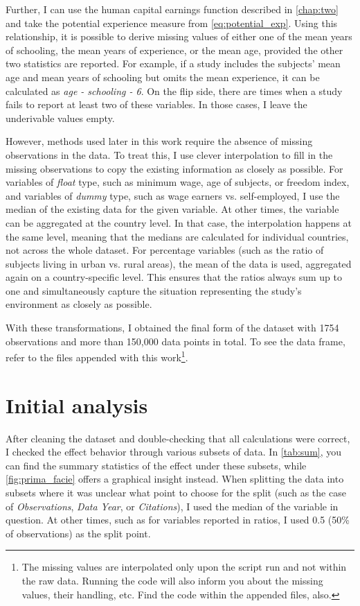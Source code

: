 Further, I can use the human capital earnings function described in \autoref{chap:two} and take the potential experience measure from \autoref{eq:potential_exp}. Using this relationship, it is possible to derive missing values of either one of the mean years of schooling, the mean years of experience, or the mean age, provided the other two statistics are reported. For example, if a study includes the subjects' mean age and mean years of schooling but omits the mean experience, it can be calculated as \textit{age - schooling - 6}. On the flip side, there are times when a study fails to report at least two of these variables. In those cases, I leave the underivable values empty.

However, methods used later in this work require the absence of missing observations in the data. To treat this, I use clever interpolation to fill in the missing observations to copy the existing information as closely as possible. For variables of \textit{float} type, such as minimum wage, age of subjects, or freedom index, and variables of \textit{dummy} type, such as wage earners vs. self-employed, I use the median of the existing data for the given variable. At other times, the variable can be aggregated at the country level. In that case, the interpolation happens at the same level, meaning that the medians are calculated for individual countries, not across the whole dataset. For percentage variables (such as the ratio of subjects living in urban vs. rural areas), the mean of the data is used, aggregated again on a country-specific level. This ensures that the ratios always sum up to one and simultaneously capture the situation representing the study's environment as closely as possible.

With these transformations, I obtained the final form of the dataset with 1754 observations and more than 150,000 data points in total. To see the data frame, refer to the files appended with this work\footnote{The missing values are interpolated only upon the script run and not within the raw data. Running the code will also inform you about the missing values, their handling, etc. Find the code within the appended files, also.}.

\section{Initial analysis}
\label{sec:initial_analysis}

After cleaning the dataset and double-checking that all calculations were correct, I checked the effect behavior through various subsets of data. In \autoref{tab:sum}, you can find the summary statistics of the effect under these subsets, while \autoref{fig:prima_facie} offers a graphical insight instead. When splitting the data into subsets where it was unclear what point to choose for the split (such as the case of \textit{Observations}, \textit{Data Year}, or \textit{Citations}), I used the median of the variable in question. At other times, such as for variables reported in ratios, I used 0.5 (50\% of observations) as the split point.

